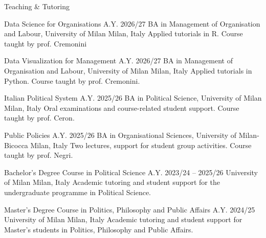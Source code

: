 \documentclass{cv}
\begin{document}

\begin{rSection}{Teaching \& Tutoring}

\subtitle{Teaching Assistantships}

\begin{teachingEntry}
{Data Science for Organisations}
{A.Y. 2026/27}
{BA in Management of Organisation and Labour, University of Milan}
{Milan, Italy}
Applied tutorials in R. Course taught by prof. Cremonini
\end{teachingEntry}

\begin{teachingEntry}
{Data Visualization for Management}
{A.Y. 2026/27}
{BA in Management of Organisation and Labour, University of Milan}
{Milan, Italy}
Applied tutorials in Python. Course taught by prof. Cremonini.
\end{teachingEntry}

\begin{teachingEntry}
{Italian Political System}
{A.Y. 2025/26}
{BA in Political Science, University of Milan}
{Milan, Italy}
Oral examinations and course-related student support. Course taught by prof. Ceron.
\end{teachingEntry}

\begin{teachingEntry}
{Public Policies}
{A.Y. 2025/26}
{BA in Organisational Sciences, University of Milan-Bicocca}
{Milan, Italy}
Two lectures, support for student group activities. Course taught by prof. Negri.
\end{teachingEntry}

\subtitle{Academic Tutoring}

\begin{teachingEntry}
{Bachelor's Degree Course in Political Science}
{A.Y. 2023/24 -- 2025/26}
{University of Milan}
{Milan, Italy}
Academic tutoring and student support for the undergraduate programme in Political Science.
\end{teachingEntry}

\begin{teachingEntry}
{Master's Degree Course in Politics, Philosophy and Public Affairs}
{A.Y. 2024/25}
{University of Milan}
{Milan, Italy}
Academic tutoring and student support for Master's students in Politics, Philosophy and Public Affairs.
\end{teachingEntry}


\end{rSection}
\end{document}
